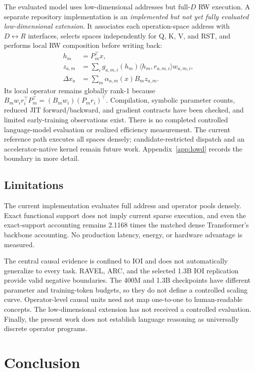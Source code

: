 \documentclass{article}
\begin{document}
The evaluated model uses low-dimensional addresses but full-\(D\) RW
execution. A separate repository implementation is an \emph{implemented but
not yet fully evaluated low-dimensional extension}. It associates each
operation-space address with \(D\!\leftrightarrow\!R\) interfaces, selects
spaces independently for Q, K, V, and RST, and performs local RW composition
before writing back:
\begin{align}
h_m&=P_m^\top x,\\
z_{a,m}&=\sum_i g_{a,m,i}(h_m)
\langle h_m,r_{a,m,i}\rangle w_{a,m,i},\\
\Delta x_a&=\sum_m\alpha_{a,m}(x)B_m z_{a,m}.
\label{eq:lowd_preview}
\end{align}
Its local operator remains globally rank-1 because
\(B_m w_i r_i^\top P_m^\top=(B_mw_i)(P_mr_i)^\top\). Compilation,
symbolic parameter counts, reduced JIT forward/backward, and gradient
contracts have been checked, and limited early-training observations exist.
There is no completed controlled language-model evaluation or realized
efficiency measurement. The current reference path executes all spaces
densely; candidate-restricted dispatch and an accelerator-native kernel remain
future work. Appendix~\ref{app:lowd} records the boundary in more detail.

\subsection{Limitations}

The current implementation evaluates full address and operator pools densely.
Exact functional support does not imply current sparse execution, and even the
exact-support accounting remains 2.1168 times the matched dense Transformer's
backbone accounting. No production latency, energy, or hardware advantage is
measured.

The central causal evidence is confined to IOI and does not automatically
generalize to every task. RAVEL, ARC, and the selected 1.3B IOI replication
provide valid negative boundaries. The 400M and 1.3B checkpoints have
different parameter and training-token budgets, so they do not define a
controlled scaling curve. Operator-level causal units need not map one-to-one
to human-readable concepts. The low-dimensional extension has not received a
controlled evaluation. Finally, the present work does not establish language
reasoning as universally discrete operator programs.

\section{Conclusion}
\end{document}
